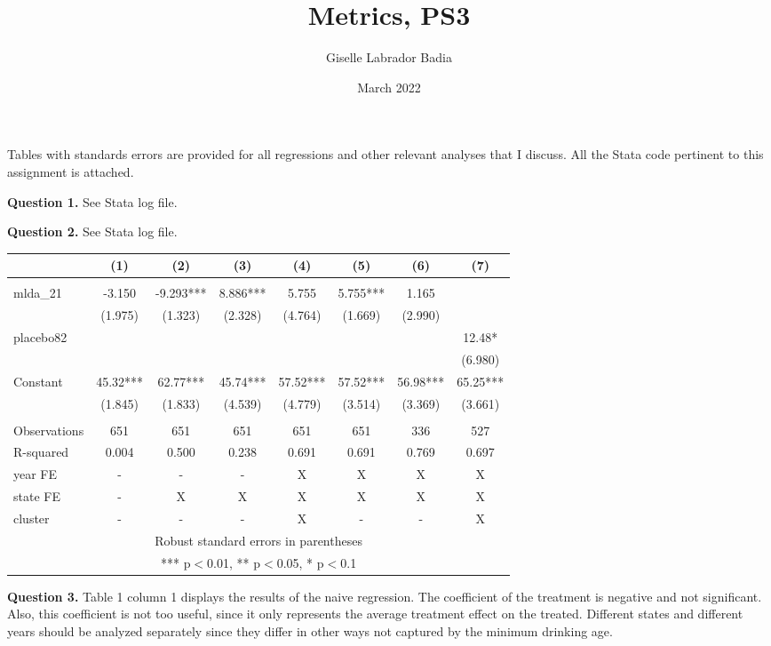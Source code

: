 \documentclass{article}
\title{Metrics, PS3}
\author{Giselle Labrador Badia}
\date{March 2022}
\theoremstyle{definition}
\begin{document}
\maketitle

 Tables with standards errors are provided for all regressions and other relevant analyses that I discuss. All the Stata code pertinent to this assignment is attached. 
 
 \hspace{0.41cm} \textbf{Question 1.} See Stata log file. 
 
 \hspace{0.41cm} \textbf{Question 2.} See Stata log file. 
 
\begin{tabular}{lccccccc} \hline
 & (1) & (2) & (3) & (4) & (5) & (6) & (7) \\ \hline
 &  &  &  &  &  &  &  \\
mlda\_21 & -3.150 & -9.293*** & 8.886*** & 5.755 & 5.755*** & 1.165 &  \\
 & (1.975) & (1.323) & (2.328) & (4.764) & (1.669) & (2.990) &  \\
placebo82 &  &  &  &  &  &  & 12.48* \\
 &  &  &  &  &  &  & (6.980) \\
Constant & 45.32*** & 62.77*** & 45.74*** & 57.52*** & 57.52*** & 56.98*** & 65.25*** \\
 & (1.845) & (1.833) & (4.539) & (4.779) & (3.514) & (3.369) & (3.661) \\
 &  &  &  &  &  &  &  \\
Observations & 651 & 651 & 651 & 651 & 651 & 336 & 527 \\
R-squared & 0.004 & 0.500 & 0.238 & 0.691 & 0.691 & 0.769 & 0.697 \\
year FE & - & - & - & X & X & X & X \\
state FE & - & X & X & X & X & X & X \\
 cluster & - & - & - & X & - & - & X \\ \hline
\multicolumn{8}{c}{ Robust standard errors in parentheses} \\
\multicolumn{8}{c}{ *** p$<$0.01, ** p$<$0.05, * p$<$0.1} \\
\end{tabular}

  \hspace{0.41cm} \textbf{Question 3.} Table 1 column 1 displays the results of the naive regression. The coefficient of the treatment is negative and not significant. Also, this coefficient is not too useful, since it only represents the average treatment effect on the treated. Different states and different years should be analyzed separately since they differ in other ways not captured by the minimum drinking age. 
  
\end{document}
